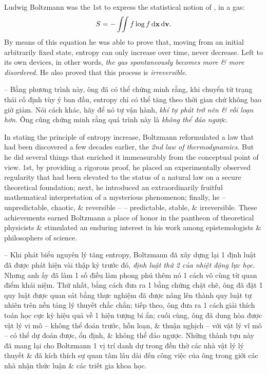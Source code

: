 \documentclass{article}
\begin{document}
\begin{enumerate}
	Ludwig Boltzmann was the 1st to express the statistical notion of , in a gas:
	\begin{equation*}
		S = -\iint f\log f\,{\rm d}{\bf x}\,{\rm d}{\bf v}.
	\end{equation*}
	By means of this equation he was able to prove that, moving from an initial arbitrarily fixed state, entropy can only increase over time, never decrease. Left to its own devices, in other words, {\it the gas spontaneously becomes more \& more disordered}. He also proved that this process is {\it irreversible}.

	-- Bằng phương trình này, ông đã có thể chứng minh rằng, khi chuyển từ trạng thái cố định tùy ý ban đầu, entropy chỉ có thể tăng theo thời gian chứ không bao giờ giảm. Nói cách khác, hãy để nó tự vận hành, {\it khí tự phát trở nên \& rối loạn hơn}. Ông cũng chứng minh rằng quá trình này là {\it không thể đảo ngược}.

	In stating the principle of entropy increase, Boltzmann reformulated a law that had been discovered a few decades earlier, the {\it 2nd law of thermodynamics}. But he did several things that enriched it immeasurably from the conceptual point of view. 1st, by providing a rigorous proof, he placed an experimentally observed regularity that had been elevated to the status of a natural law on a secure theoretical foundation; next, he introduced an extraordinarily fruitful mathematical interpretation of a mysterious phenomenon; finally, he  -- unpredictable, chaotic, \& reversible --  -- predictable, stable, \& irreversible. These achievements earned Boltzmann a place of honor in the pantheon of theoretical physicists \& stimulated an enduring interest in his work among epistemologists \& philosophers of science.

	-- Khi phát biểu nguyên lý tăng entropy, Boltzmann đã xây dựng lại 1 định luật đã được phát hiện vài thập kỷ trước đó, {\it định luật thứ 2 của nhiệt động lực học}. Nhưng anh ấy đã làm 1 số điều làm phong phú thêm nó 1 cách vô cùng từ quan điểm khái niệm. Thứ nhất, bằng cách đưa ra 1 bằng chứng chặt chẽ, ông đã đặt 1 quy luật được quan sát bằng thực nghiệm đã được nâng lên thành quy luật tự nhiên trên nền tảng lý thuyết chắc chắn; tiếp theo, ông đưa ra 1 cách giải thích toán học cực kỳ hiệu quả về 1 hiện tượng bí ẩn; cuối cùng, ông đã dung hòa được vật lý vi mô -- không thể đoán trước, hỗn loạn, \& thuận nghịch -- với vật lý vĩ mô -- có thể dự đoán được, ổn định, \& không thể đảo ngược. Những thành tựu này đã mang lại cho Boltzmann 1 vị trí danh dự trong đền thờ các nhà vật lý lý thuyết \& đã kích thích sự quan tâm lâu dài đến công việc của ông trong giới các nhà nhận thức luận \& các triết gia khoa học.


\end{enumerate}
\end{document}
